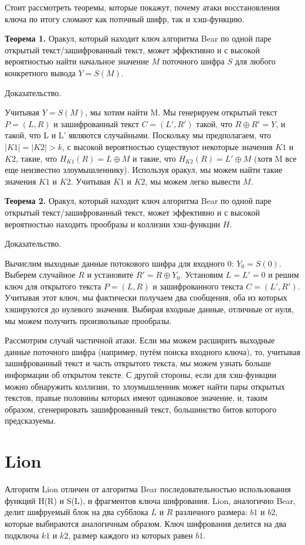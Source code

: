 \documentclass[12pt]{article}
\begin{document}
Стоит рассмотреть теоремы, которые покажут, почему атаки восстановления ключа по итогу сломают как поточный шифр, так и хэш-функцию.    

\vspace{5mm}
\textbf{Теорема 1.} Оракул, который находит ключ алгоритма Bear по одной паре открытый текст/зашифрованный текст, может эффективно и с высокой вероятностью найти начальное значение $M$ поточного шифра $S$ для любого конкретного вывода $Y = S(M)$.

Доказательство. 

Учитывая $Y = S (M)$, мы хотим найти M. Мы генерируем открытый текст $P = (L, R)$
и зашифрованный текст $C = (L', R')$ такой, что $R \oplus R' = Y$, и такой, что L и L'
являются случайными. Поскольку мы предполагаем, что $|K1| = |K2| > k$, с высокой вероятностью
существуют некоторые значения $K1$ и $K2$, такие, что $H_{K1}(R) = L \oplus M$ и такие, что
$H_{K2}(R) = L' \oplus M$ (хотя M все еще неизвестно злоумышленнику). Используя
оракул, мы можем найти такие значения $K1$ и $K2$. Учитывая $K1$ и $K2$, мы можем легко
вывести $M$.

\vspace{5mm}
\textbf{Теорема 2.} Оракул, который находит ключ алгоритма Bear по одной паре открытый текст/зашифрованный текст, может эффективно и с высокой вероятностью находить прообразы и коллизии
хэш-функции $H$.

Доказательство. 

Вычислим выходные данные потокового шифра для входного 0: $Y_{0} = S(0)$.
Выберем случайное $R$ и установите $R' = R \oplus Y_{0}$. Установим $L = L' = 0$ и решим ключ для открытого текста $P = (L, R)$ и зашифрованного текста $C = (L', R')$. Учитывая этот ключ, мы фактически получаем два сообщения, оба из которых хэшируются до нулевого значения. Выбирая входные данные, отличные от нуля, мы можем получить произвольные прообразы.

\vspace{5mm}
Рассмотрим случай частичной атаки. Если мы можем расширить выходные данные поточного шифра (например, путём поиска входного ключа), то, учитывая зашифрованный текст и часть открытого текста, мы можем узнать больше информации об открытом тексте. С другой стороны, если для хэш-функции можно обнаружить коллизии, то злоумышленник может найти пары открытых текстов, правые половины которых имеют одинаковое значение, и, таким образом, сгенерировать зашифрованный текст, большинство битов которого предсказуемы.


\section{Lion}
Алгоритм Lion отличен от алгоритма Bear последовательностью использования функций H(R) и S(L), и фрагментов ключа шифрования. Lion, аналогично Bear, делит шифруемый блок на два субблока $L$ и $R$ различного размера: $b1$ и $b2$, которые выбираются аналогичным образом. Ключ шифрования делится на два подключа $k1$ и $k2$, размер каждого из которых равен $b1$.
\end{document}
